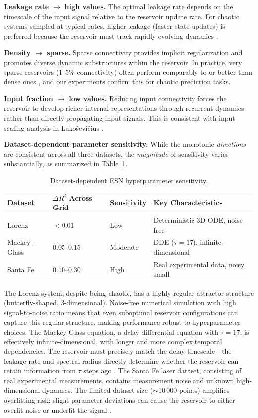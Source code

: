 \textbf{Leakage rate $\to$ high values.} The optimal leakage rate depends on the timescale of the input signal relative to the reservoir update rate. For chaotic systems sampled at typical rates, higher leakage (faster state updates) is preferred because the reservoir must track rapidly evolving dynamics \cite{lukosevicius2012practical}.

\textbf{Density $\to$ sparse.} Sparse connectivity provides implicit regularization and promotes diverse dynamic substructures within the reservoir. In practice, very sparse reservoirs (1--5\% connectivity) often perform comparably to or better than dense ones \cite{lukosevicius2009reservoir}, and our experiments confirm this for chaotic prediction tasks.

\textbf{Input fraction $\to$ low values.} Reducing input connectivity forces the reservoir to develop richer internal representations through recurrent dynamics rather than directly propagating input signals. This is consistent with input scaling analysis in Luko\v{s}evi\v{c}ius \cite{lukosevicius2012practical}.

\textbf{Dataset-dependent parameter sensitivity.} While the monotonic \emph{directions} are consistent across all three datasets, the \emph{magnitude} of sensitivity varies substantially, as summarized in Table~\ref{tab:sensitivity}.

\begin{table}[H]
\centering
\caption{Dataset-dependent ESN hyperparameter sensitivity.}
\label{tab:sensitivity}
\small
\begin{tabular}{@{}llll@{}}
\toprule
Dataset & $\Delta R^2$ Across Grid & Sensitivity & Key Characteristics \\
\midrule
Lorenz       & $< 0.01$     & Low      & Deterministic 3D ODE, noise-free \\
Mackey-Glass & $0.05$--$0.15$ & Moderate & DDE ($\tau = 17$), infinite-dimensional \\
Santa Fe     & $0.10$--$0.30$ & High     & Real experimental data, noisy, small \\
\bottomrule
\end{tabular}
\end{table}

The Lorenz system, despite being chaotic, has a highly regular attractor structure (butterfly-shaped, 3-dimensional). Noise-free numerical simulation with high signal-to-noise ratio means that even suboptimal reservoir configurations can capture this regular structure, making performance robust to hyperparameter choices. The Mackey-Glass equation, a delay differential equation with $\tau = 17$, is effectively infinite-dimensional, with longer and more complex temporal dependencies. The reservoir must precisely match the delay timescale---the leakage rate and spectral radius directly determine whether the reservoir can retain information from $\tau$ steps ago \cite{jaeger2004harnessing}. The Santa Fe laser dataset, consisting of real experimental measurements, contains measurement noise and unknown high-dimensional dynamics. The limited dataset size (${\sim}$10\,000 points) amplifies overfitting risk: slight parameter deviations can cause the reservoir to either overfit noise or underfit the signal \cite{weigend1994time}.

